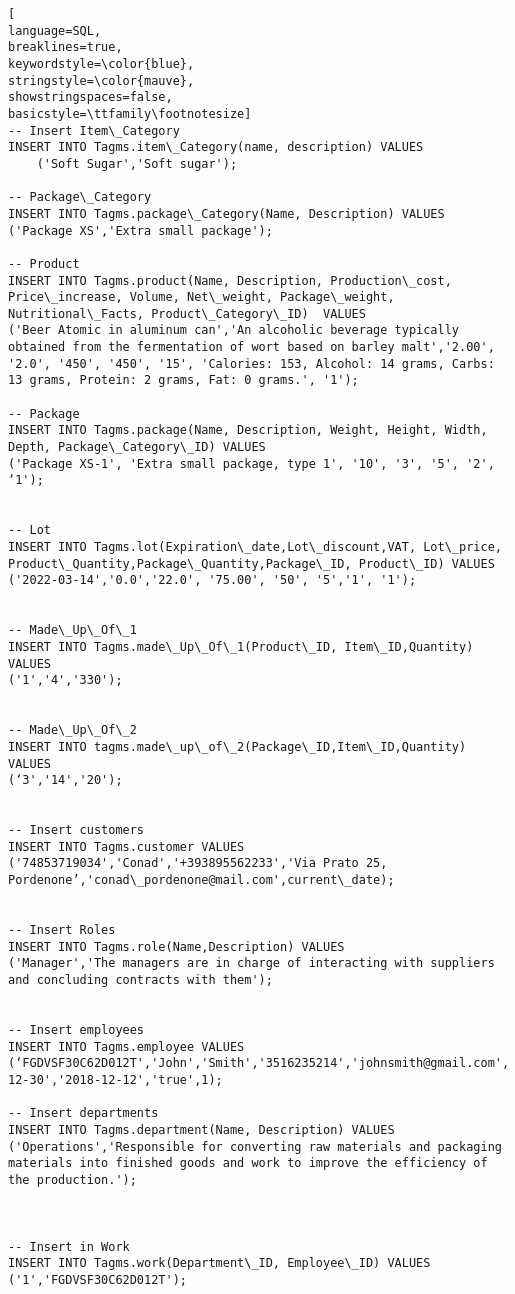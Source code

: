\begin{lstlisting}[
language=SQL,
breaklines=true,
keywordstyle=\color{blue},
stringstyle=\color{mauve},
showstringspaces=false,
basicstyle=\ttfamily\footnotesize]
-- Insert Item\_Category
INSERT INTO Tagms.item\_Category(name, description) VALUES
    ('Soft Sugar','Soft sugar');
    
-- Package\_Category
INSERT INTO Tagms.package\_Category(Name, Description) VALUES 
('Package XS','Extra small package');

-- Product
INSERT INTO Tagms.product(Name, Description, Production\_cost, Price\_increase, Volume, Net\_weight, Package\_weight, Nutritional\_Facts, Product\_Category\_ID)  VALUES
('Beer Atomic in aluminum can','An alcoholic beverage typically obtained from the fermentation of wort based on barley malt','2.00', '2.0', '450', '450', '15', 'Calories: 153, Alcohol: 14 grams, Carbs: 13 grams, Protein: 2 grams, Fat: 0 grams.', '1');

-- Package
INSERT INTO Tagms.package(Name, Description, Weight, Height, Width, Depth, Package\_Category\_ID) VALUES
('Package XS-1', 'Extra small package, type 1', '10', '3', '5', '2', ‘1');


-- Lot
INSERT INTO Tagms.lot(Expiration\_date,Lot\_discount,VAT, Lot\_price, Product\_Quantity,Package\_Quantity,Package\_ID, Product\_ID) VALUES
('2022-03-14','0.0','22.0', '75.00', '50', '5','1', '1');


-- Made\_Up\_Of\_1
INSERT INTO Tagms.made\_Up\_Of\_1(Product\_ID, Item\_ID,Quantity) VALUES
('1','4','330');


-- Made\_Up\_Of\_2
INSERT INTO tagms.made\_up\_of\_2(Package\_ID,Item\_ID,Quantity) VALUES
(‘3','14','20');									


-- Insert customers
INSERT INTO Tagms.customer VALUES
('74853719034','Conad','+393895562233','Via Prato 25, Pordenone’,'conad\_pordenone@mail.com',current\_date);


-- Insert Roles
INSERT INTO Tagms.role(Name,Description) VALUES
('Manager','The managers are in charge of interacting with suppliers and concluding contracts with them');


-- Insert employees
INSERT INTO Tagms.employee VALUES
(‘FGDVSF30C62D012T','John','Smith','3516235214','johnsmith@gmail.com','1995-12-30','2018-12-12','true',1);

-- Insert departments
INSERT INTO Tagms.department(Name, Description) VALUES
('Operations','Responsible for converting raw materials and packaging materials into finished goods and work to improve the efficiency of the production.');



-- Insert in Work
INSERT INTO Tagms.work(Department\_ID, Employee\_ID) VALUES
('1','FGDVSF30C62D012T');



\end{lstlisting}
